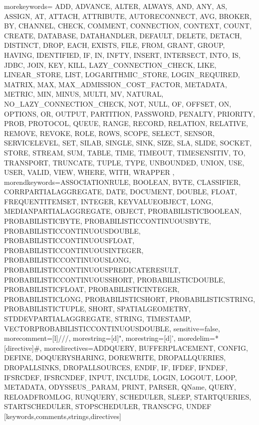 %
   {morekeywords={%
ADD, ADVANCE, ALTER, ALWAYS, AND, ANY, AS, ASSIGN, AT, ATTACH, ATTRIBUTE, AUTORECONNECT, AVG, BROKER, BY, CHANNEL, CHECK, COMMENT, CONNECTION, CONTEXT, COUNT, CREATE, DATABASE, DATAHANDLER, DEFAULT, DELETE, DETACH, DISTINCT, DROP, EACH, EXISTS, FILE, FROM, GRANT, GROUP, HAVING, IDENTIFIED, IF, IN, INFTY, INSERT, INTERSECT, INTO, IS, JDBC, JOIN, KEY, KILL, LAZY_CONNECTION_CHECK, LIKE, LINEAR_STORE, LIST, LOGARITHMIC_STORE, LOGIN_REQUIRED, MATRIX, MAX, MAX_ADMISSION_COST_FACTOR, METADATA, METRIC, MIN, MINUS, MULTI, MV, NATURAL, NO_LAZY_CONNECTION_CHECK, NOT, NULL, OF, OFFSET, ON, OPTIONS, OR, OUTPUT, PARTITION, PASSWORD, PENALTY, PRIORITY, PROB, PROTOCOL, QUEUE, RANGE, RECORD, RELATION, RELATIVE, REMOVE, REVOKE, ROLE, ROWS, SCOPE, SELECT, SENSOR, SERVICELEVEL, SET, SILAB, SINGLE, SINK, SIZE, SLA, SLIDE, SOCKET, STORE, STREAM, SUM, TABLE, TIME, TIMEOUT, TIMESENSITIV, TO, TRANSPORT, TRUNCATE, TUPLE, TYPE, UNBOUNDED, UNION, USE, USER, VALID, VIEW, WHERE, WITH, WRAPPER%
      },%
   morendkeywords={ASSOCIATIONRULE, BOOLEAN, BYTE, CLASSIFIER, CORRPARTIALAGGREGATE, DATE, DOCUMENT, DOUBLE, FLOAT, FREQUENTITEMSET, INTEGER, KEYVALUEOBJECT, LONG, MEDIANPARTIALAGGREGATE, OBJECT, PROBABILISTICBOOLEAN, PROBABILISTICBYTE, PROBABILISTICCONTINUOUSBYTE, PROBABILISTICCONTINUOUSDOUBLE, PROBABILISTICCONTINUOUSFLOAT, PROBABILISTICCONTINUOUSINTEGER, PROBABILISTICCONTINUOUSLONG, PROBABILISTICCONTINUOUSPREDICATERESULT, PROBABILISTICCONTINUOUSSHORT, PROBABILISTICDOUBLE, PROBABILISTICFLOAT, PROBABILISTICINTEGER, PROBABILISTICLONG, PROBABILISTICSHORT, PROBABILISTICSTRING, PROBABILISTICTUPLE, SHORT, SPATIALGEOMETRY, STDDEVPARTIALAGGREGATE, STRING, TIMESTAMP, VECTORPROBABILISTICCONTINUOUSDOUBLE},%
   sensitive=false,
   morecomment=[l]///,%
   morestring=[d]",%
   morestring=[d]',%
   moredelim=*[directive]\#,%
   moredirectives={ADDQUERY, BUFFERPLACEMENT, CONFIG, DEFINE, DOQUERYSHARING, DOREWRITE, DROPALLQUERIES, DROPALLSINKS, DROPALLSOURCES, ENDIF, IF, IFDEF, IFNDEF, IFSRCDEF, IFSRCNDEF, INPUT, INCLUDE, LOGIN, LOGOUT, LOOP, METADATA, ODYSSEUS_PARAM, PRINT, PARSER, QName, QUERY, RELOADFROMLOG, RUNQUERY, SCHEDULER, SLEEP, STARTQUERIES, STARTSCHEDULER, STOPSCHEDULER, TRANSCFG, UNDEF}%
}[keywords,comments,strings,directives]

